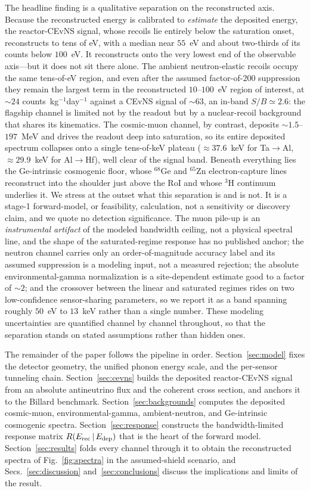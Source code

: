 The headline finding is a qualitative separation on the reconstructed axis. Because the reconstructed energy is calibrated to \emph{estimate} the deposited energy, the reactor-CEvNS signal, whose recoils lie entirely below the saturation onset, reconstructs to tens of eV, with a median near $55$~eV and about two-thirds of its counts below $100$~eV. It reconstructs onto the very lowest end of the observable axis---but it does not sit there alone. The ambient neutron-elastic recoils occupy the same tens-of-eV region, and even after the assumed factor-of-$200$ suppression they remain the largest term in the reconstructed $10$--$100$~eV region of interest, at $\sim$$24$ counts~kg$^{-1}$day$^{-1}$ against a CEvNS signal of $\sim$$63$, an in-band $S/B\simeq2.6$: the flagship channel is limited not by the readout but by a nuclear-recoil background that shares its kinematics. The cosmic-muon channel, by contrast, deposits $\sim$$1.5$--$197$~MeV and drives the readout deep into saturation, so its entire deposited spectrum collapses onto a single tens-of-keV plateau ($\approx$$37.6$~keV for Ta$\to$Al, $\approx$$29.9$~keV for Al$\to$Hf), well clear of the signal band. Beneath everything lies the Ge-intrinsic cosmogenic floor, whose $^{68}$Ge and $^{65}$Zn electron-capture lines reconstruct into the shoulder just above the RoI and whose $^{3}$H continuum underlies it. We stress at the outset what this separation is and is not. It is a stage-1 forward-model, or feasibility, calculation, not a sensitivity or discovery claim, and we quote no detection significance. The muon pile-up is an \emph{instrumental artifact} of the modeled bandwidth ceiling, not a physical spectral line, and the shape of the saturated-regime response has no published anchor; the neutron channel carries only an order-of-magnitude accuracy label and its assumed suppression is a modeling input, not a measured rejection; the absolute environmental-gamma normalization is a site-dependent estimate good to a factor of $\sim$$2$; and the crossover between the linear and saturated regimes rides on two low-confidence sensor-sharing parameters, so we report it as a band spanning roughly $50$~eV to $13$~keV rather than a single number. These modeling uncertainties are quantified channel by channel throughout, so that the separation stands on stated assumptions rather than hidden ones.

The remainder of the paper follows the pipeline in order. Section~\ref{sec:model} fixes the detector geometry, the unified phonon energy scale, and the per-sensor tunneling chain. Section~\ref{sec:cevns} builds the deposited reactor-CEvNS signal from an absolute antineutrino flux and the coherent cross section, and anchors it to the Billard benchmark. Section~\ref{sec:backgrounds} computes the deposited cosmic-muon, environmental-gamma, ambient-neutron, and Ge-intrinsic cosmogenic spectra. Section~\ref{sec:response} constructs the bandwidth-limited response matrix $R(E_{\rm rec}\,|\,E_{\rm dep})$ that is the heart of the forward model. Section~\ref{sec:results} folds every channel through it to obtain the reconstructed spectra of Fig.~\ref{fig:spectra} in the assumed-shield scenario, and Secs.~\ref{sec:discussion} and~\ref{sec:conclusions} discuss the implications and limits of the result.
